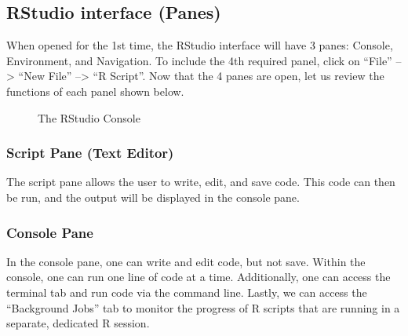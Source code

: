 \documentclass[
  letterpaper,
  DIV=11,
  numbers=noendperiod]{scrreprt}
\begin{document}
\subsection{RStudio interface (Panes)}\label{rstudio-interface-panes}

When opened for the 1st time, the RStudio interface will have 3 panes:
Console, Environment, and Navigation. To include the 4th required panel,
click on ``File'' --\textgreater{} ``New File'' --\textgreater{} ``R
Script''. Now that the 4 panes are open, let us review the functions of
each panel shown below.

\begin{figure}


\caption{\label{fig-rstudio-console-1}The RStudio Console}

\end{figure}%

\subsubsection{Script Pane (Text Editor)}\label{script-pane-text-editor}

The script pane allows the user to write, edit, and save code. This code
can then be run, and the output will be displayed in the console pane.

\subsubsection{Console Pane}\label{console-pane}

In the console pane, one can write and edit code, but not save. Within
the console, one can run one line of code at a time. Additionally, one
can access the terminal tab and run code via the command line. Lastly,
we can access the ``Background Jobs'' tab to monitor the progress of R
scripts that are running in a separate, dedicated R session.
\end{document}
